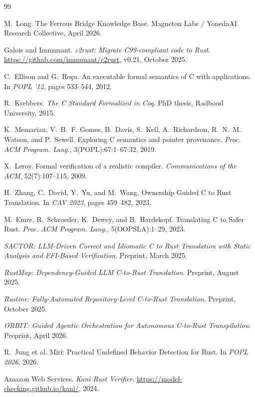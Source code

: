\documentclass[12pt]{article}
\theoremstyle{definition}
\theoremstyle{remark}
\begin{document}
\begin{thebibliography}{99}

 M.~Long. The Ferrous Bridge Knowledge Base. Magneton Labs / YonedaAI Research Collective, April 2026.

 Galois and Immunant. \emph{c2rust: Migrate C99-compliant code to Rust}. \url{https://github.com/immunant/c2rust}, v0.21, October 2025.

 C.~Ellison and G.~Ro\c{s}u. An executable formal semantics of C with applications. In \emph{POPL '12}, pages 533--544, 2012.

 R.~Krebbers. \emph{The C Standard Formalized in Coq}. PhD thesis, Radboud University, 2015.

 K.~Memarian, V.~B.~F. Gomes, B.~Davis, S.~Kell, A.~Richardson, R.~N.~M. Watson, and P.~Sewell. Exploring C semantics and pointer provenance. \emph{Proc. ACM Program. Lang.}, 3(POPL):67:1--67:32, 2019.

 X.~Leroy. Formal verification of a realistic compiler. \emph{Communications of the ACM}, 52(7):107--115, 2009.

 H.~Zhang, C.~David, Y.~Yu, and M.~Wang. Ownership Guided C to Rust Translation. In \emph{CAV 2023}, pages 459--482, 2023.

 M.~Emre, R.~Schroeder, K.~Dewey, and B.~Hardekopf. Translating C to Safer Rust. \emph{Proc. ACM Program. Lang.}, 5(OOPSLA):1--29, 2023.

 \emph{SACTOR: LLM-Driven Correct and Idiomatic C to Rust Translation with Static Analysis and FFI-Based Verification}. Preprint, March 2025.

 \emph{RustMap: Dependency-Guided LLM C-to-Rust Translation}. Preprint, August 2025.

 \emph{Rustine: Fully-Automated Repository-Level C-to-Rust Translation}. Preprint, October 2025.

 \emph{ORBIT: Guided Agentic Orchestration for Autonomous C-to-Rust Transpilation}. Preprint, April 2026.

 R.~Jung et al. Miri: Practical Undefined Behavior Detection for Rust. In \emph{POPL 2026}, 2026.

 Amazon Web Services. \emph{Kani Rust Verifier}. \url{https://model-checking.github.io/kani/}, 2024.


\end{thebibliography}
\end{document}
